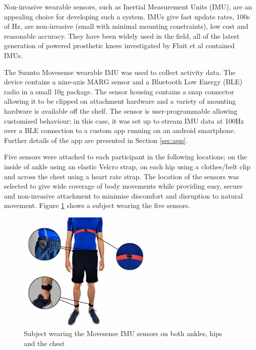 \documentclass[sensors,article,submit,moreauthors,pdftex]{Definitions/mdpi}
\begin{document}
Non-invasive wearable sensors, such as Inertial Measurement Units (IMU), are an appealing choice for developing such a system. IMUs give fast update rates, 100s of Hz, are non-invasive (small with minimal mounting constraints), low cost and reasonable accuracy. They have been widely used in the field, all of the latest generation of powered prosthetic knees investigated by Fluit et al contained IMUs\cite{Fluit2020}.

The Suunto Movesense wearable IMU was used to collect activity data. The device contains a nine-axis MARG sensor and a Bluetooth Low Energy (BLE) radio in a small 10g package. The sensor housing contains a snap connector allowing it to be clipped on attachment hardware and a variety of mounting hardware is available off the shelf. The sensor is user-programmable allowing customised behaviour; in this case, it was set up to stream IMU data at 100Hz over a BLE connection to a custom app running on an android smartphone. Further details of the app are presented in Section \ref{sec:app}.

Five sensors were attached to each participant in the following locations; on the inside of ankle using an elastic Velcro strap, on each hip using a clothes/belt clip and across the chest using a heart rate strap. The location of the sensors was selected to give wide coverage of body movements while providing easy, secure and non-invasive attachment to minimise discomfort and disruption to natural movement. Figure \ref{fig:movesense_sensors} shows a subject wearing the five sensors.

\begin{figure}[!hbt]
    \centering
    \includegraphics[height=220px]{Figures/movesense/sensor_locations.jpg}
    \caption{Subject wearing the Movesense IMU sensors on both ankles, hips and the chest}
    \label{fig:movesense_sensors}
\end{figure}
\end{document}
